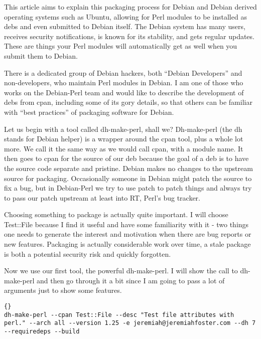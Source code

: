 This article aims to explain this packaging process for Debian and Debian
derived operating systems such as Ubuntu, allowing for Perl modules to be
installed as debs and even submitted to Debian itself. The Debian system has
many users, receives security notif\hbox{}ications, is known for its stability, and
gets regular updates. These are things your Perl modules will automatically get
as well when you submit them to Debian.

There is a dedicated group of Debian hackers, both ``Debian Developers'' and
non-developers, who maintain Perl modules in Debian. I am one of those who works
on the Debian-Perl team\cite{debs_cpan-debian_perl_team} and would like to
describe the development of debs from cpan, including some of its gory details,
so that others can be familiar with ``best practices'' of packaging software for
Debian. 

Let us begin with a tool called dh-make-perl, shall we? Dh-make-perl (the dh
stands for Debian helper) is a wrapper around the cpan tool, plus a whole lot
more. We call it the same way as we would call cpan, with a module name. It then
goes to cpan for the source of our deb because the goal of a deb is to have the
source code separate and pristine. Debian makes no changes to the upstream
source for packaging. Occasionally someone in Debian might patch the source to
f\hbox{}ix a bug, but in Debian-Perl we try to use patch to patch things and always try
to pass our patch upstream at least into RT, Perl's bug tracker. 

Choosing something to package is actually quite important. I will choose
Test::F\hbox{}ile because I f\hbox{}ind it useful and have some familiarity with it - two
things one needs to generate the interest and motivation when there are bug
reports or new features. Packaging is actually considerable work over time, a
stale package is both a potential security risk and quickly forgotten.

Now we use our f\hbox{}irst tool, the powerful dh-make-perl. I will show the call to
dh-make-perl and then go through it a bit since I am going to pass a lot of
arguments just to show some features.

\begin{lstlisting}[frame=trbl,label=cl:debs_cpan:dh-make-perl,caption=dh-make-perl command]{}
dh-make-perl --cpan Test::File --desc "Test file attributes with perl." --arch all --version 1.25 -e jeremiah@jeremiahfoster.com --dh 7 --requiredeps --build
\end{lstlisting}

